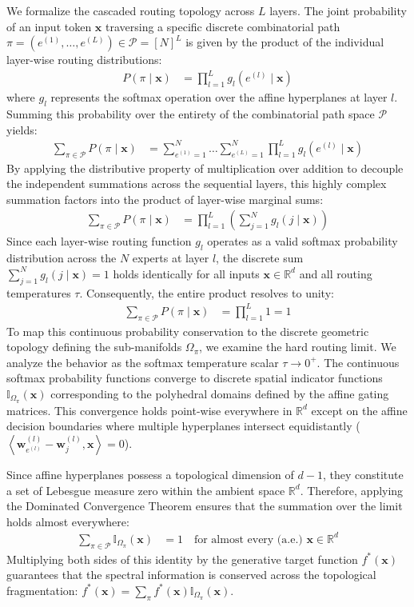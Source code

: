 \documentclass{article}
\newcommand{\R}{\mathbb{R}}
\newcommand{\1}{\mathbb{I}}
\newcommand{\inner}[2]{\left\langle#1, #2\right\rangle}
\newcommand{\calP}{\mathcal{P}}
\newcommand{\bx}{\mathbf{x}}
\newcommand{\bw}{\mathbf{w}}
\begin{document}
We formalize the cascaded routing topology across $L$ layers. The joint probability of an input token $\bx$ traversing a specific discrete combinatorial path $\pi = (e^{(1)}, \dots, e^{(L)}) \in \calP = [N]^L$ is given by the product of the individual layer-wise routing distributions:
\begin{align}
    P(\pi \mid \bx) &= \prod_{l=1}^L g_l(e^{(l)} \mid \bx)
\end{align}
where $g_l$ represents the softmax operation over the affine hyperplanes at layer $l$. Summing this probability over the entirety of the combinatorial path space $\calP$ yields:
\begin{align}
    \sum_{\pi \in \calP} P(\pi \mid \bx) &= \sum_{e^{(1)}=1}^N \dots \sum_{e^{(L)}=1}^N \prod_{l=1}^L g_l(e^{(l)} \mid \bx)
\end{align}
By applying the distributive property of multiplication over addition to decouple the independent summations across the sequential layers, this highly complex summation factors into the product of layer-wise marginal sums:
\begin{align}
    \sum_{\pi \in \calP} P(\pi \mid \bx) &= \prod_{l=1}^L \left( \sum_{j=1}^N g_l(j \mid \bx) \right)
\end{align}
Since each layer-wise routing function $g_l$ operates as a valid softmax probability distribution across the $N$ experts at layer $l$, the discrete sum $\sum_{j=1}^N g_l(j \mid \bx) = 1$ holds identically for all inputs $\bx \in \R^d$ and all routing temperatures $\tau$. Consequently, the entire product resolves to unity:
\begin{align}
    \sum_{\pi \in \calP} P(\pi \mid \bx) &= \prod_{l=1}^L 1 = 1
\end{align}
To map this continuous probability conservation to the discrete geometric topology defining the sub-manifolds $\Omega_\pi$, we examine the hard routing limit. We analyze the behavior as the softmax temperature scalar $\tau \to 0^+$. The continuous softmax probability functions converge to discrete spatial indicator functions $\1_{\Omega_\pi}(\bx)$ corresponding to the polyhedral domains defined by the affine gating matrices. This convergence holds point-wise everywhere in $\R^d$ except on the affine decision boundaries where multiple hyperplanes intersect equidistantly ($\inner{\bw_{e^{(l)}}^{(l)} - \bw_j^{(l)}}{\bx} = 0$). 

Since affine hyperplanes possess a topological dimension of $d-1$, they constitute a set of Lebesgue measure zero within the ambient space $\R^d$. Therefore, applying the Dominated Convergence Theorem ensures that the summation over the limit holds almost everywhere:
\begin{align}
    \sum_{\pi \in \calP} \1_{\Omega_\pi}(\bx) &= 1 \quad \text{for almost every (a.e.) } \bx \in \R^d
\end{align}
Multiplying both sides of this identity by the generative target function $f^*(\bx)$ guarantees that the spectral information is conserved across the topological fragmentation: $f^*(\bx) = \sum_{\pi} f^*(\bx) \1_{\Omega_\pi}(\bx)$.
\end{document}
